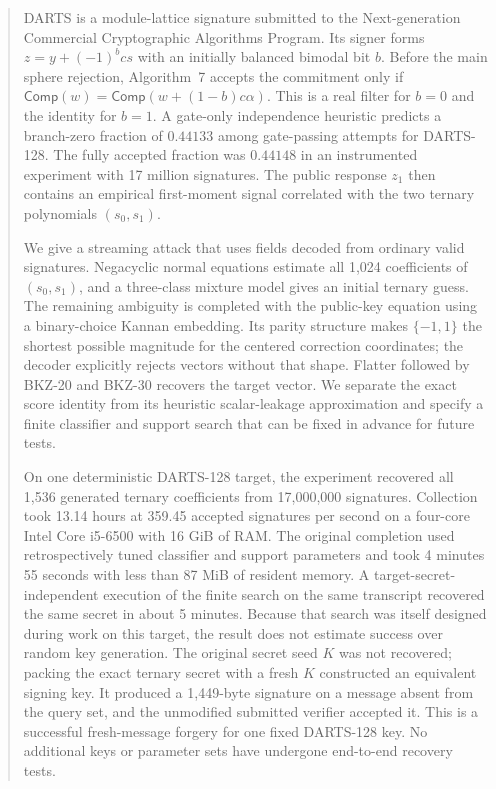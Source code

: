 \documentclass[11pt,a4paper]{article}
\newcommand{\Comp}{\mathsf{Comp}}
\begin{document}
\begin{abstract}
DARTS is a module-lattice signature submitted to the Next-generation
Commercial Cryptographic Algorithms Program.  Its signer forms
$z=y+(-1)^bcs$ with an initially balanced bimodal bit $b$.  Before the main
sphere rejection, Algorithm~7 accepts the commitment only if
$\Comp(w)=\Comp(w+(1-b)c\alpha)$.  This is a real filter for $b=0$ and the
identity for $b=1$.  A gate-only independence heuristic predicts a
branch-zero fraction of $0.44133$ among gate-passing attempts for DARTS-128.
The fully accepted fraction was $0.44148$ in an instrumented experiment with
17 million signatures.  The public response $z_1$ then contains an empirical
first-moment signal correlated with the two ternary polynomials $(s_0,s_1)$.

We give a streaming attack that uses fields decoded from ordinary valid
signatures.  Negacyclic normal equations estimate all 1,024 coefficients of
$(s_0,s_1)$, and a three-class mixture model gives an initial ternary guess.
The remaining ambiguity is completed with the public-key equation using a
binary-choice Kannan embedding.  Its parity structure makes $\{-1,1\}$ the
shortest possible magnitude for the centered correction coordinates; the
decoder explicitly rejects vectors without that shape.  Flatter followed by
BKZ-20 and BKZ-30 recovers the target vector.  We separate the exact score
identity from its heuristic scalar-leakage approximation and specify a finite
classifier and support search that can be fixed in advance for future tests.

On one deterministic DARTS-128 target, the experiment recovered all 1,536
generated ternary coefficients from 17,000,000 signatures.  Collection took
13.14 hours at 359.45 accepted signatures per second on a four-core Intel
Core i5-6500 with 16 GiB of RAM.  The original completion used retrospectively
tuned classifier and support parameters and took 4 minutes 55 seconds with
less than 87 MiB of resident memory.  A target-secret-independent execution
of the finite search on the same transcript recovered the same secret in
about 5 minutes.  Because that search was itself designed during work on this
target, the result does not estimate success over random key generation.  The
original secret seed $K$ was not recovered; packing the exact ternary secret
with a fresh $K$ constructed an equivalent signing key.  It produced a
1,449-byte signature on a message absent from the query set, and the
unmodified submitted verifier accepted it.  This is a successful fresh-message
forgery for one fixed DARTS-128 key.  No additional keys or parameter sets
have undergone end-to-end recovery tests.
\end{abstract}
\end{document}
